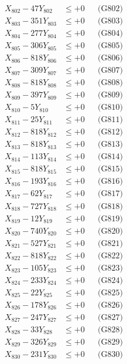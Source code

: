 \documentclass[a4paper,10pt]{article}
\begin{document}
{\begin{align}
X_{802} - 47Y_{802} &\leq +0 && \text{(G802)} \\
X_{803} - 351Y_{803} &\leq +0 && \text{(G803)} \\
X_{804} - 277Y_{804} &\leq +0 && \text{(G804)} \\
X_{805} - 306Y_{805} &\leq +0 && \text{(G805)} \\
X_{806} - 818Y_{806} &\leq +0 && \text{(G806)} \\
X_{807} - 309Y_{807} &\leq +0 && \text{(G807)} \\
X_{808} - 818Y_{808} &\leq +0 && \text{(G808)} \\
X_{809} - 397Y_{809} &\leq +0 && \text{(G809)} \\
X_{810} - 5Y_{810} &\leq +0 && \text{(G810)} \\
\allowbreak
X_{811} - 25Y_{811} &\leq +0 && \text{(G811)} \\
X_{812} - 818Y_{812} &\leq +0 && \text{(G812)} \\
X_{813} - 818Y_{813} &\leq +0 && \text{(G813)} \\
X_{814} - 113Y_{814} &\leq +0 && \text{(G814)} \\
X_{815} - 818Y_{815} &\leq +0 && \text{(G815)} \\
X_{816} - 193Y_{816} &\leq +0 && \text{(G816)} \\
X_{817} - 62Y_{817} &\leq +0 && \text{(G817)} \\
X_{818} - 727Y_{818} &\leq +0 && \text{(G818)} \\
X_{819} - 12Y_{819} &\leq +0 && \text{(G819)} \\
X_{820} - 740Y_{820} &\leq +0 && \text{(G820)} \\
\allowbreak
X_{821} - 527Y_{821} &\leq +0 && \text{(G821)} \\
X_{822} - 818Y_{822} &\leq +0 && \text{(G822)} \\
X_{823} - 105Y_{823} &\leq +0 && \text{(G823)} \\
X_{824} - 233Y_{824} &\leq +0 && \text{(G824)} \\
X_{825} - 22Y_{825} &\leq +0 && \text{(G825)} \\
X_{826} - 178Y_{826} &\leq +0 && \text{(G826)} \\
X_{827} - 247Y_{827} &\leq +0 && \text{(G827)} \\
X_{828} - 33Y_{828} &\leq +0 && \text{(G828)} \\
X_{829} - 326Y_{829} &\leq +0 && \text{(G829)} \\
X_{830} - 231Y_{830} &\leq +0 && \text{(G830)} \\

\end{align}}
\end{document}
